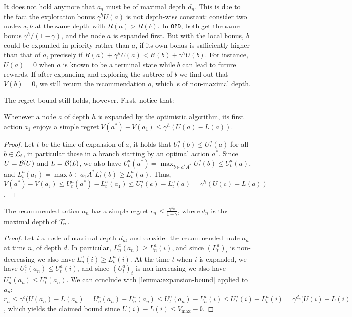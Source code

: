 \documentclass{article}
\begin{document}
\begin{remark}
It does not hold anymore that $a_n$ must be of maximal depth $d_n$.  This is due to the fact the exploration bonus $\gamma^h U(a)$ is not depth-wise constant: consider two nodes $a,b$ at the same depth with $R(a) > R(b)$. In \texttt{OPD}, both get the same bonus $\gamma^h/(1-\gamma)$, and the node $a$ is expanded first. But with the local bonus, $b$ could be expanded in priority rather than $a$, if its own bonus is sufficiently higher than that of $a$, precisely if $R(a)+\gamma^h U(a) < R(b)+\gamma^h U(b)$. For instance, $U(a)=0$ when $a$ is known to be a terminal state while $b$ can lead to future rewards. If after expanding and exploring the subtree of $b$ we find out that $V(b) = 0$, we still return the recommendation $a$, which is of non-maximal depth.
\end{remark}

The regret bound still holds, however. First, notice that:
\begin{lemma}
\label{lemma:expansion-bound}
Whenever a node $a$ of depth $h$ is expanded by the optimistic algorithm, its first action $a_1$ enjoys a simple regret $V(a^*)-V(a_1) \leq \gamma^h(U(a)-L(a))$. 
\end{lemma}
\begin{proof}
Let $t$ be the time of expansion of $a$, it holds that $U^a_t(b) \leq U^a_t(a)$ for all $b\in \mathcal{L}_t$, in particular those in a branch starting by an optimal action $a^*$. Since $U=\mathcal{B}(U)$ and $L=\mathcal{B}(L)$, we also have $U^a_t(a^*) = \max_{b\in a^*A^*} U^a_t(b) \leq U^a_t(a)$, and $L^a_t(a_1) = \max{b\in a_1 A^*} L^a_t(b) \geq  L^a_t(a)$. Thus, $V(a^*)-V(a_1) \leq U^a_t(a^*) - L^a_t(a_1) \leq U^a_t(a) - L^a_t(a) = \gamma^h(U(a)-L(a))$.
\end{proof}
 
\begin{lemma}
The recommended action $a_n$ has a simple regret $r_n \leq \frac{\gamma^{d_n}}{1-\gamma}$, where $d_n$ is the maximal depth of $\mathcal{T}_n$.
\end{lemma}
\begin{proof}
Let $i$ a node of maximal depth $d_n$, and consider the recommended node $a_n$ at time $n$, of depth $d$. In particular, $L^a_n(a_n) \geq L^a_n(i)$, and since $(L^a_t)_t$ is non-decreasing we also have $L^a_n(i) \geq L^a_t(i)$. At the time $t$ when $i$ is expanded, we have $U^a_t(a_n) \leq U^a_t(i)$, and since $(U^a_t)_t$ is non-increasing we also have $U^a_n(a_n) \leq U^a_t(a_n)$. We can conclude with \autoref{lemma:expansion-bound} applied to $a_n$: $r_n \leq \gamma^d(U(a_n)-L(a_n) = U^a_n(a_n) - L^a_n(a_n)  \leq U^a_t(a_n) - L^a_n(i) \leq U^a_t(i) - L^a_t(i) = \gamma^{d_n}(U(i) - L(i)$, which yields the claimed bound since $U(i) - L(i) \leq V_{\max}-0$.
\end{proof}
\end{document}
